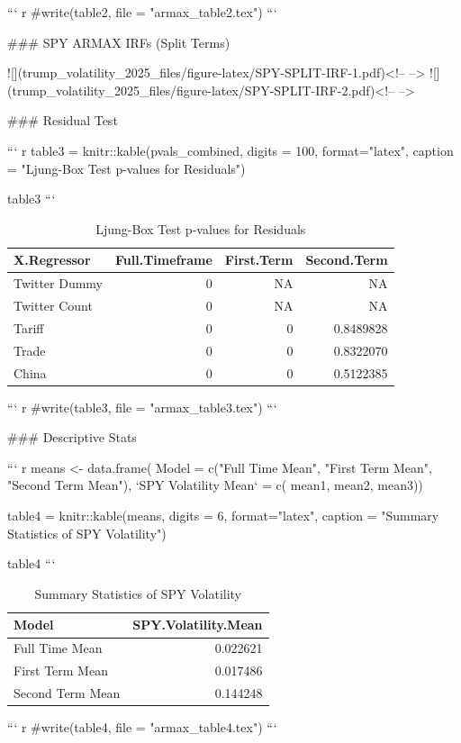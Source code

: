 \documentclass[
]{article}
\begin{document}
{\begin{appendix}
``` r
#write(table2, file = "armax_table2.tex")
```


### SPY ARMAX IRFs (Split Terms)

![](trump_volatility_2025_files/figure-latex/SPY-SPLIT-IRF-1.pdf)<!-- --> ![](trump_volatility_2025_files/figure-latex/SPY-SPLIT-IRF-2.pdf)<!-- --> 


### Residual Test 


``` r
table3 = knitr::kable(pvals_combined, digits = 100, format="latex",
             caption = "Ljung-Box Test p-values for Residuals")

table3
```

\begin{table}

\caption{\label{tab:SPY-res-test}Ljung-Box Test p-values for Residuals}
\centering
\begin{tabular}[t]{l|r|r|r}
\hline
X.Regressor & Full.Timeframe & First.Term & Second.Term\\
\hline
Twitter Dummy & 0 & NA & NA\\
\hline
Twitter Count & 0 & NA & NA\\
\hline
Tariff & 0 & 0 & 0.8489828\\
\hline
Trade & 0 & 0 & 0.8322070\\
\hline
China & 0 & 0 & 0.5122385\\
\hline
\end{tabular}
\end{table}

``` r
#write(table3, file = "armax_table3.tex")
```

### Descriptive Stats
 

``` r
means <- data.frame(
  Model = c("Full Time Mean", "First Term Mean", "Second Term Mean"),
  `SPY Volatility Mean` = c(
    mean1,
    mean2,
    mean3))

table4 = knitr::kable(means, digits = 6, format="latex",
             caption = "Summary Statistics of SPY Volatility")

table4
```

\begin{table}

\caption{\label{tab:means-table}Summary Statistics of SPY Volatility}
\centering
\begin{tabular}[t]{l|r}
\hline
Model & SPY.Volatility.Mean\\
\hline
Full Time Mean & 0.022621\\
\hline
First Term Mean & 0.017486\\
\hline
Second Term Mean & 0.144248\\
\hline
\end{tabular}
\end{table}

``` r
#write(table4, file = "armax_table4.tex")
```
















\end{appendix}}
\end{document}
